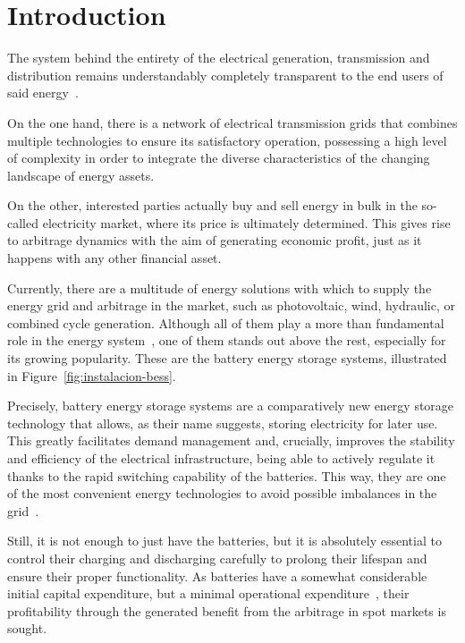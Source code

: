 \cleardoublepage%

\chapter*{Introduction}%
\label{makereference9}

The system behind the entirety of the electrical generation, transmission and distribution remains understandably completely transparent to the end users of said energy~\cite{garrues2009red}.

On the one hand, there is a network of electrical transmission grids that combines multiple technologies to ensure its satisfactory operation, possessing a high level of complexity in order to integrate the diverse characteristics of the changing landscape of energy assets.

On the other, interested parties actually buy and sell energy in bulk in the so-called electricity market, where its price is ultimately determined. This gives rise to arbitrage dynamics with the aim of generating economic profit, just as it happens with any other financial asset.

Currently, there are a multitude of energy solutions with which to supply the energy grid and arbitrage in the market, such as photovoltaic, wind, hydraulic, or combined cycle generation. Although all of them play a more than fundamental role in the energy system~\cite{turkenburg2000renewable}, one of them stands out above the rest, especially for its growing popularity. These are the battery energy storage systems, illustrated in Figure~\ref{fig:instalacion-bess}.

Precisely, battery energy storage systems are a comparatively new energy storage technology that allows, as their name suggests, storing electricity for later use. This greatly facilitates demand management and, crucially, improves the stability and efficiency of the electrical infrastructure, being able to actively regulate it thanks to the rapid switching capability of the batteries. This way, they are one of the most convenient energy technologies to avoid possible imbalances in the grid~\cite{xu2014bess}.

Still, it is not enough to just have the batteries, but it is absolutely essential to control their charging and discharging carefully to prolong their lifespan and ensure their proper functionality. As batteries have a somewhat considerable initial capital expenditure, but a minimal operational expenditure~\cite{larsson2018cost}, their profitability through the generated benefit from the arbitrage in spot markets is sought.

